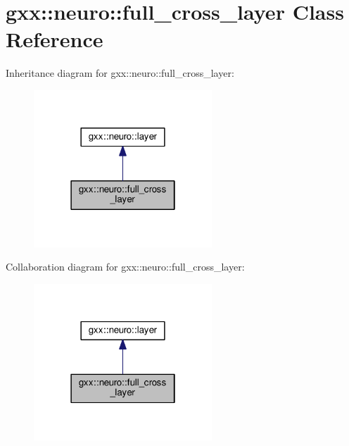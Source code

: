 \hypertarget{classgxx_1_1neuro_1_1full__cross__layer}{}\section{gxx\+:\+:neuro\+:\+:full\+\_\+cross\+\_\+layer Class Reference}
\label{classgxx_1_1neuro_1_1full__cross__layer}


Inheritance diagram for gxx\+:\+:neuro\+:\+:full\+\_\+cross\+\_\+layer\+:
\nopagebreak
\begin{figure}[H]
\begin{center}
\leavevmode
\includegraphics[width=190pt]{classgxx_1_1neuro_1_1full__cross__layer__inherit__graph}
\end{center}
\end{figure}


Collaboration diagram for gxx\+:\+:neuro\+:\+:full\+\_\+cross\+\_\+layer\+:
\nopagebreak
\begin{figure}[H]
\begin{center}
\leavevmode
\includegraphics[width=190pt]{classgxx_1_1neuro_1_1full__cross__layer__coll__graph}
\end{center}
\end{figure}
